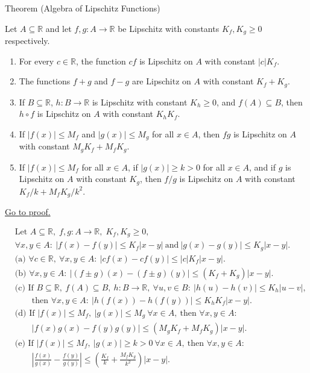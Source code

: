 \begin{theorembox}{Theorem (Algebra of Lipschitz Functions)}
\begin{theorem}
\label{thm:algebra-of-lipschitz-functions}
Let $A\subseteq \mathbb{R}$ and let $f,g:A\to\mathbb{R}$ be Lipschitz with constants $K_f,K_g\ge 0$ respectively.
\begin{enumerate}[label=(\alph*)]
\item For every $c\in\mathbb{R}$, the function $cf$ is Lipschitz on $A$ with constant $|c|K_f$.
\item The functions $f+g$ and $f-g$ are Lipschitz on $A$ with constant $K_f+K_g$.
\item If $B\subseteq\mathbb{R}$, $h:B\to\mathbb{R}$ is Lipschitz with constant $K_h\ge 0$, and $f(A)\subseteq B$, then $h\circ f$ is Lipschitz on $A$ with constant $K_hK_f$.
\item If $|f(x)|\le M_f$ and $|g(x)|\le M_g$ for all $x\in A$, then $fg$ is Lipschitz on $A$ with constant $M_gK_f+M_fK_g$.
\item If $|f(x)|\le M_f$ for all $x\in A$, if $|g(x)|\ge k>0$ for all $x\in A$, and if $g$ is Lipschitz on $A$ with constant $K_g$, then $f/g$ is Lipschitz on $A$ with constant $K_f/k + M_fK_g/k^2$.
\end{enumerate}
\hyperref[prf:algebra-of-lipschitz-functions]{Go to proof.}
\end{theorem}
\end{theorembox}

\begin{remark*}
\[
\begin{aligned}
&\text{Let } A\subseteq\mathbb{R},\; f,g:A\to\mathbb{R},\; K_f,K_g\ge 0,\\
&\forall x,y\in A:\ |f(x)-f(y)|\le K_f|x-y|\ \text{and}\ |g(x)-g(y)|\le K_g|x-y|.\\
&\text{(a) }\forall c\in\mathbb{R},\ \forall x,y\in A:\ |cf(x)-cf(y)|\le |c|K_f|x-y|.\\
&\text{(b) }\forall x,y\in A:\ |(f\pm g)(x)-(f\pm g)(y)|\le (K_f+K_g)|x-y|.\\
&\text{(c) }\text{If }B\subseteq\mathbb{R},\ f(A)\subseteq B,\ h:B\to\mathbb{R},\ \forall u,v\in B:\ |h(u)-h(v)|\le K_h|u-v|,\\
&\qquad\text{then }\forall x,y\in A:\ |h(f(x))-h(f(y))|\le K_hK_f|x-y|.\\
&\text{(d) }\text{If }|f(x)|\le M_f,\ |g(x)|\le M_g\ \forall x\in A,\ \text{then } \forall x,y\in A:\\
&\qquad |f(x)g(x)-f(y)g(y)|\le (M_gK_f+M_fK_g)|x-y|.\\
&\text{(e) }\text{If }|f(x)|\le M_f,\ |g(x)|\ge k>0\ \forall x\in A,\ \text{then }\forall x,y\in A:\\
&\qquad \left|\frac{f(x)}{g(x)}-\frac{f(y)}{g(y)}\right|\le \left(\frac{K_f}{k}+\frac{M_fK_g}{k^2}\right)|x-y|.
\end{aligned}
\]
\end{remark*}

